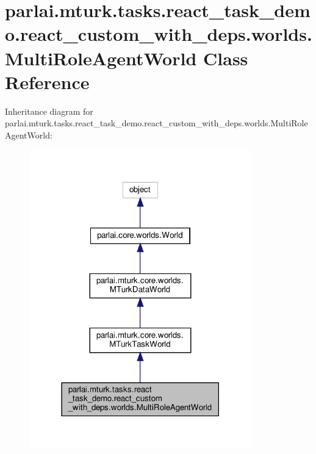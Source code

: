 \hypertarget{classparlai_1_1mturk_1_1tasks_1_1react__task__demo_1_1react__custom__with__deps_1_1worlds_1_1MultiRoleAgentWorld}{}\section{parlai.\+mturk.\+tasks.\+react\+\_\+task\+\_\+demo.\+react\+\_\+custom\+\_\+with\+\_\+deps.\+worlds.\+Multi\+Role\+Agent\+World Class Reference}
\label{classparlai_1_1mturk_1_1tasks_1_1react__task__demo_1_1react__custom__with__deps_1_1worlds_1_1MultiRoleAgentWorld}


Inheritance diagram for parlai.\+mturk.\+tasks.\+react\+\_\+task\+\_\+demo.\+react\+\_\+custom\+\_\+with\+\_\+deps.\+worlds.\+Multi\+Role\+Agent\+World\+:
\nopagebreak
\begin{figure}[H]
\begin{center}
\leavevmode
\includegraphics[width=273pt]{d3/d68/classparlai_1_1mturk_1_1tasks_1_1react__task__demo_1_1react__custom__with__deps_1_1worlds_1_1Mula36fb957a0e3a56bdf7c4d43c96df003}
\end{center}
\end{figure}



